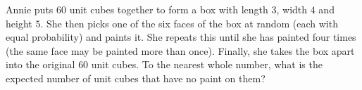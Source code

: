 Annie puts $60$ unit cubes together to form a box with length $3$, width $4$ and height $5$. She then picks one of the six faces of the box at random (each with equal probability) and paints it. She repeats this until she has painted four times (the same face may be painted more than once). Finally, she takes the box apart into the original $60$ unit cubes. To the nearest whole number, what is the expected number of unit cubes that have no paint on them?
